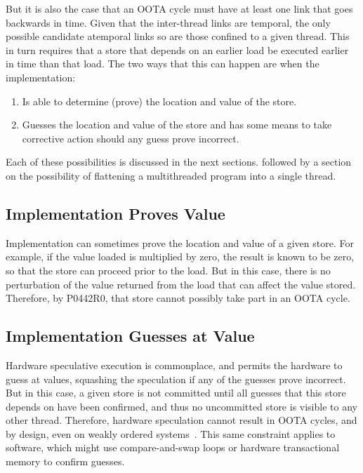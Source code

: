 \documentclass[10]{article}
\begin{document}
But it is also the case that an OOTA cycle must have at least one link
that goes backwards in time.
Given that the inter-thread links are temporal, the only possible
candidate atemporal links so are those confined to a given thread.
This in turn requires that a store that depends on an earlier load
be executed earlier in time than that load.
The two ways that this can happen are when the implementation:

\begin{enumerate}
\item	Is able to determine (prove) the location and value of the store.
\item	Guesses the location and value of the store and has some means
	to take corrective action should any guess prove incorrect.
\end{enumerate}

Each of these possibilities is discussed in the next sections.
followed by a section on the possibility of flattening a multithreaded
program into a single thread.

\subsection{Implementation Proves Value}
\label{sec:Implementation Proves Value}

Implementation can sometimes prove the location and value of a given
store.
For example, if the value loaded is multiplied by zero, the result
is known to be zero, so that the store can proceed prior to the load.
But in this case, there is no perturbation of the value returned from
the load that can affect the value stored.
Therefore, by P0442R0, that store cannot possibly take part in an
OOTA cycle.

\subsection{Implementation Guesses at Value}
\label{sec:Implementation Guesses at Value}

Hardware speculative execution is commonplace, and permits the
hardware to guess at values, squashing the speculation if any
of the guesses prove incorrect.
But in this case, a given store is not committed until all guesses that
this store depends on have been confirmed, and thus no uncommitted store
is visible to any other thread.
Therefore, hardware speculation cannot result in OOTA cycles, and
by design, even on weakly ordered
systems~\cite{ARMv7A:2010,ARMv8A:2017,PowerISA2.07-2013}.
This same constraint applies to software, which might use compare-and-swap
loops or hardware transactional memory to confirm guesses.
\end{document}
